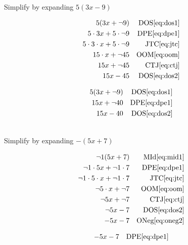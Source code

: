 \begin{example}[id:20141109-091015] \label{20141109-091015}  \hfill \\

Simplify by expanding $5(3x-9)$

\soln

\solnsteps
\begin{align*}
5(3x+ \neg 9)  && \text{DOS} \eqref{eq:dos1} \\
5 \cdot 3x + 5 \cdot \neg 9  && \text{DPE} \eqref{eq:dpe1} \\  
5 \cdot 3 \cdot x + 5 \cdot \neg 9  && \text{JTC} \eqref{eq:jtc} \\
15 \cdot x + \neg 45  && \text{OOM} \eqref{eq:oom} \\
15x + \neg 45  && \text{CTJ} \eqref{eq:ctj} \\
15x - 45  && \text{DOS} \eqref{eq:dos2}  
\end{align*}

\soln

\lesssteps
\begin{align*}
5(3x+\neg 9) && \text{DOS} \eqref{eq:dos1} \\
15x+ \neg 40 && \text{DPE} \eqref{eq:dpe1} \\
15x-40 && \text{DOS} \eqref{eq:dos2}  
\end{align*}

\end{example}

\begin{example}[id:20141109-092448] \label{20141109-092448}  \hfill \\

Simplify by expanding $-(5x+7)$

\soln

\solnsteps
\begin{align*}
\neg 1(5x+7) && \text{MId} \eqref{eq:mid1} \\ 
\neg 1 \cdot 5x + \neg 1 \cdot 7  && \text{DPE} \eqref{eq:dpe1} \\
\neg 1 \cdot 5 \cdot x + \neg 1 \cdot 7  && \text{JTC} \eqref{eq:jtc} \\
\neg 5 \cdot x + \neg 7 && \text{OOM} \eqref{eq:oom} \\
\neg 5 x + \neg 7  && \text{CTJ} \eqref{eq:ctj} \\
\neg 5x - 7  && \text{DOS} \eqref{eq:dos2} \\
-5x-7  && \text{ONeg} \eqref{eq:oneg2} 
\end{align*}

\soln

\lesssteps
\begin{align*}
-5x-7 && \text{DPE} \eqref{eq:dpe1} 
\end{align*}

\end{example}

